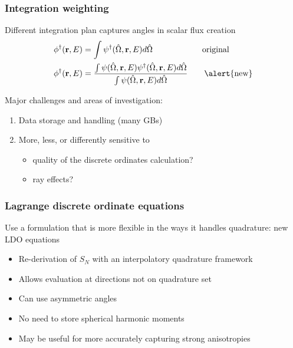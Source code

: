 \documentclass[xcolor=x11names,compress]{beamer}
\renewcommand{\(}{\begin{columns}}
\renewcommand{\)}{\end{columns}}
\newcommand{\<}[1]{\begin{column}{#1}}
\renewcommand{\>}{\end{column}}
\newcommand{\vOmega}{\ensuremath{\hat{\Omega}}}
\newcommand{\ve}[1]{\ensuremath{\mathbf{#1}}}
\begin{document}
\begin{frame}[fragile]
  \frametitle{Integration weighting}

    Different integration plan captures angles in scalar flux creation	
	\begin{align*}
		\phi^{\dagger}(\ve{r},E) &= \int \psi^{\dagger}(\vOmega, 
		\ve{r},E) d\vOmega \qquad  \qquad \qquad \text{original}\\
		\phi^{\dagger}(\ve{r},E) &= \frac{\int \psi(\vOmega, \ve{r},E)
		 \psi^{\dagger}(\vOmega, \ve{r},E) d\vOmega}{\int \psi(\vOmega, 
		 \ve{r},E)  d\vOmega} \qquad \text{\alert{new}}
	\end{align*}

    \pause
    Major challenges and areas of investigation:
	\begin{enumerate}
	\item Data storage and handling (many GBs)
	\item More, less, or differently sensitive to 
	  \begin{itemize}
	  \item quality of the discrete ordinates calculation?
	  \item ray effects?
	  \end{itemize}
	\end{enumerate}

\end{frame}

\begin{frame}[fragile]
  \frametitle{Lagrange discrete ordinate equations}

    Use a formulation that is more flexible in the ways 
	it handles quadrature: new LDO equations \cite{Ahrens2014}
	\vspace*{1 em}
	
	\begin{itemize}
	\item Re-derivation of $S_N$ with an \alert{interpolatory quadrature framework}
	\item Allows evaluation at directions not on quadrature set
	\item Can use \alert{asymmetric angles}
	\item No need to store spherical harmonic moments
	\item May be useful for more accurately capturing strong anisotropies
	\end{itemize}

\end{frame}
\end{document}
